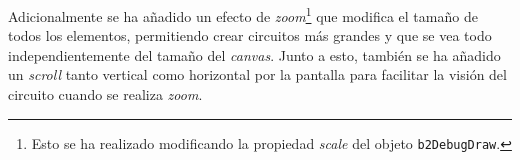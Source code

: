 Adicionalmente se ha añadido un efecto de \emph{zoom}\footnote{Esto se ha realizado modificando la propiedad \emph{scale} del objeto \texttt{b2DebugDraw}.} que modifica el tamaño de todos los elementos, permitiendo crear circuitos más grandes y que se vea todo independientemente del tamaño del \emph{canvas}. Junto a esto, también se ha añadido un \emph{scroll} tanto vertical como horizontal por la pantalla para facilitar la visión del circuito cuando se realiza \emph{zoom}.
